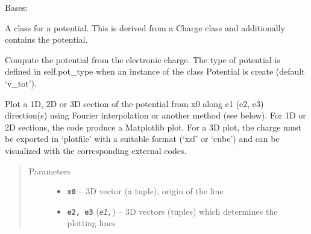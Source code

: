 \documentclass[letterpaper,10pt,english]{sphinxmanual}
\begin{document}
\begin{fulllineitems}
\label{postqe:postqe.charge.Potential}
Bases: {\hyperref[postqe:postqe.charge.Charge]{\emph{}}}

A class for a potential. This is derived from a Charge class and additionally contains the potential.

\begin{fulllineitems}
\label{postqe:postqe.charge.Potential.compute_potential}
Compute the potential from the electronic charge. The type of potential is defined in self.pot\_type when
an instance of the class Potential is create (default `v\_tot').

\end{fulllineitems}


\begin{fulllineitems}
\label{postqe:postqe.charge.Potential.plot}
Plot a 1D, 2D or 3D section of the potential from x0 along e1 (e2, e3) direction(s) using Fourier interpolation
or another method (see below). For 1D or 2D sections, the code produce a Matplotlib plot. For a 3D plot, the
charge must be exported in `plotfile' with a suitable format (`xsf' or `cube') and can be visualized with
the corresponding external codes.
\begin{quote}\begin{description}
\item[{Parameters}] \leavevmode\begin{itemize}
\item {} 
\textbf{\texttt{x0}} -- 3D vector (a tuple), origin of the line

\item {} 
\textbf{\texttt{e2, e3}} (\emph{\texttt{e1,}}) -- 3D vectors (tuples) which determines the plotting lines


\end{itemize}
\end{description}
\end{quote}
\end{fulllineitems}
\end{fulllineitems}
\end{document}
